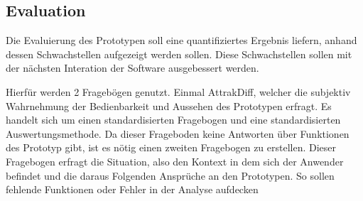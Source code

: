 \subsection{Evaluation}
Die Evaluierung des Prototypen soll eine quantifiziertes Ergebnis liefern, anhand dessen Schwachstellen aufgezeigt werden sollen. Diese Schwachstellen sollen mit der nächsten Interation der Software ausgebessert werden.

Hierfür werden 2 Fragebögen genutzt. Einmal AttrakDiff, welcher die subjektiv  Wahrnehmung der Bedienbarkeit und Aussehen des Prototypen erfragt. Es handelt sich um einen standardisierten Fragebogen und eine standardisierten Auswertungsmethode. Da dieser Frageboden keine Antworten über Funktionen des Prototyp gibt, ist es nötig einen zweiten Fragebogen zu erstellen. Dieser Fragebogen erfragt die Situation, also den Kontext in dem sich der Anwender befindet und die daraus Folgenden Ansprüche an den Prototypen. So sollen fehlende Funktionen oder Fehler in der Analyse aufdecken

